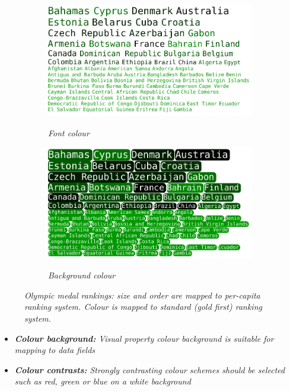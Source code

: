 \begin{figure}[!htb]
\begin{subfigure}{\textwidth}
	\centering
	\includegraphics[scale=0.50]{foregroundex.png}
	\label{fig:foregroundsub}
	\caption{\textit{Font colour}}
\end{subfigure}
\begin{subfigure}{\textwidth}
  \centering
  \includegraphics[scale=0.50]{backgroundex.png}
  \label{fig:backgroundsub}
  \caption{\textit{Background colour}}
\end{subfigure}
  \caption{\textit{Olympic medal rankings: size and order are mapped to per-capita ranking system. Colour is mapped to standard (gold first) ranking system.}}
  \label{fig:background}
\end{figure}

\begin{itemize}
	\item \emph{\textbf{Colour background:} Visual property colour background is suitable for mapping to data fields}	
	\item \emph{\textbf{Colour contrasts:} Strongly contrasting colour schemes should be selected such as red, green or blue on a white background}	
\end{itemize}

